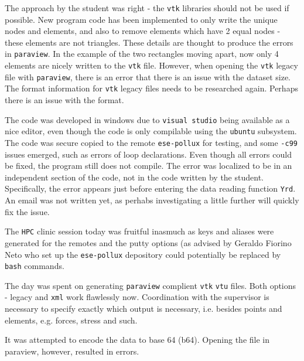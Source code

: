\fbox{\theverbbox}

\bigbreak
{}
The approach by the student was right - the \texttt{vtk} libraries should not be used if possible. New program code has been implemented to only write the unique nodes and elements, and also to remove elements which have 2 equal nodes - these elements are not triangles. These details are thought to produce the errors in \texttt{paraview}. In the example of the two rectangles moving apart, now only 4 elements are nicely written to the \texttt{vtk} file. However, when opening the \texttt{vtk} legacy file with \texttt{paraview}, there is an error that there is an issue with the dataset size. The format information for \texttt{vtk} legacy files needs to be researched again. Perhaps there is an issue with the format.

\bigbreak
The code was developed in windows due to \texttt{visual studio} being available as a nice editor, even though the code is only compilable using the \texttt{ubuntu} subsystem. The code was secure copied to the remote \texttt{ese-pollux} for testing, and some \texttt{-c99} issues emerged, such as errors of loop declarations. Even though all errors could be fixed, the program still does not compile. The error was localized to be in an independent section of the code, not in the code written by the student. Specifically, the error appears just before entering the data reading function \texttt{Yrd}. An email was not written yet, as perhabs investigating a little further will quickly fix the issue.

\bigbreak
The \texttt{HPC} clinic session today was fruitful inasmuch as keys and aliases were generated for the remotes and the putty options (as advised by Geraldo Fiorino Neto who set up the \texttt{ese-pollux} depository could potentially be replaced by \texttt{bash} commands.

\bigbreak
{} The day was spent on generating \texttt{paraview} complient \texttt{vtk} \texttt{vtu} files. Both options - legacy and \texttt{xml} work flawlessly now. Coordination with the supervisor is necessary to specify exactly which output is necessary, i.e. besides points and elements, e.g. forces, stress and such.

\bigbreak
{} 
It was attempted to encode the data to base 64 (b64). Opening the file in paraview, however, resulted in errors.

